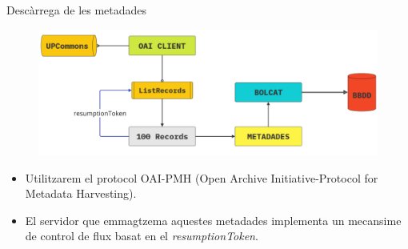 \begin{frame}{Descàrrega de les metadades}

    \begin{figure}
        \includegraphics[width=\textwidth]{figures/metadata-processing}
        \label{fig:metadata-processing}
    \end{figure}

    \begin{itemize}%
        \item Utilitzarem el protocol OAI-PMH (Open Archive Initiative-Protocol for Metadata Harvesting).
        \item El servidor que emmagtzema aquestes metadades implementa un mecansime de control de flux basat en el \textit{resumptionToken}.
    \end{itemize}

\end{frame}